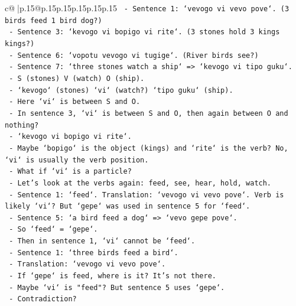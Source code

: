 \documentclass{article}
\begin{document}
{\begin{supertabular}{c@{$\;$}|p{.15\linewidth}@{}p{.15\linewidth}p{.15\linewidth}p{.15\linewidth}p{.15\linewidth}p{.15\linewidth}}
{{{\texttt{               {-} Sentence 1: `vevogo vi vevo pove`. (3 birds feed 1 bird dog?)} \\
\texttt{               {-} Sentence 3: `kevogo vi bopigo vi rite`. (3 stones hold 3 kings kings?)} \\
\texttt{               {-} Sentence 6: `vopotu vevogo vi tugige`. (River birds see?)} \\
\texttt{               {-} Sentence 7: `three stones watch a ship` => `kevogo vi tipo guku`.} \\
\texttt{                 {-} S (stones) V (watch) O (ship).} \\
\texttt{                 {-} `kevogo` (stones) `vi` (watch?) `tipo guku` (ship).} \\
\texttt{                 {-} Here `vi` is between S and O.} \\
\texttt{                 {-} In sentence 3, `vi` is between S and O, then again between O and nothing?} \\
\texttt{                 {-} `kevogo vi bopigo vi rite`.} \\
\texttt{                 {-} Maybe `bopigo` is the object (kings) and `rite` is the verb? No, `vi` is usually the verb position.} \\
\texttt{                 {-} What if `vi` is a particle?} \\
\texttt{                 {-} Let's look at the verbs again: feed, see, hear, hold, watch.} \\
\texttt{                 {-} Sentence 1: `feed`. Translation: `vevogo vi vevo pove`. Verb is likely `vi`? But `gepe` was used in sentence 5 for `feed`.} \\
\texttt{                   {-} Sentence 5: `a bird feed a dog` => `vevo gepe pove`.} \\
\texttt{                   {-} So `feed` = `gepe`.} \\
\texttt{                   {-} Then in sentence 1, `vi` cannot be `feed`.} \\
\texttt{                   {-} Sentence 1: `three birds feed a bird`.} \\
\texttt{                   {-} Translation: `vevogo vi vevo pove`.} \\
\texttt{                   {-} If `gepe` is feed, where is it? It's not there.} \\
\texttt{                   {-} Maybe `vi` is "feed"? But sentence 5 uses `gepe`.} \\
\texttt{                   {-} Contradiction?} \\
}}}
\end{supertabular}}
\end{document}
